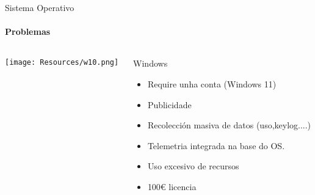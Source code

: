 \documentclass{beamer}
\begin{document}
\begin{frame}{Sistema Operativo}
  \framesubtitle{Problemas}

  \begin{columns}
    \begin{column}{0.5\textwidth}
      \texttt{[image: Resources/w10.png]}


    \end{column}

    \begin{column}{0.4\textwidth}
      \begin{block}{Windows}
        \begin{itemize}
          \item Require unha conta (Windows 11)
          \item Publicidade
          \item Recolección masiva de datos (uso,keylog....)
          \item Telemetria integrada na base do OS.
          \item Uso excesivo de recursos
          \item 100€ licencia
        \end{itemize}
      \end{block}

    \end{column}

  \end{columns}

\end{frame}
\end{document}
